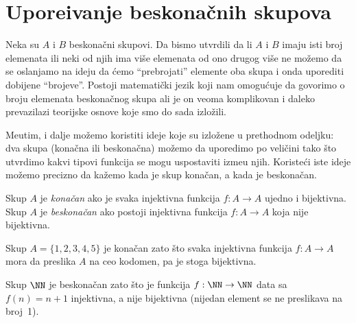 \section[UPORE\Dj IVANJE BESKONA\v CNIH SKUPOVA]{Upore\dj ivanje beskona\v cnih skupova}

Neka su $A$ i $B$ beskona\v cni skupovi. Da bismo utvrdili da li $A$ i $B$ imaju isti broj elemenata
ili neki od njih ima vi\v se elemenata od ono drugog vi\v se ne mo\v zemo da se oslanjamo na ideju da \'cemo
``prebrojati'' elemente oba skupa i onda uporediti dobijene ``brojeve''.
Postoji matemati\v cki jezik koji nam omogu\'cuje da govorimo o broju elemenata beskona\v cnog skupa ali je on
veoma komplikovan i daleko prevazilazi teorijske osnove koje smo do sada izlo\v zili.

Me\dj utim, i dalje mo\v zemo koristiti ideje koje su izlo\v zene u prethodnom odeljku:
dva skupa (kona\v cna ili beskona\v cna) mo\v zemo da uporedimo po veli\v cini tako \v sto
utvrdimo kakvi tipovi funkcija se mogu uspostaviti izme\dj u njih.
Koriste\'ci iste ideje mo\v zemo precizno da ka\v zemo kada je skup kona\v can, a kada je beskona\v can.

Skup $A$ je \emph{kona\v can} ako je svaka injektivna funkcija $f : A \to A$ ujedno i bijektivna.
Skup $A$ je \emph{beskona\v can} ako postoji injektivna funkcija $f : A \to A$ koja nije bijektivna.

\begin{EX}
  Skup $A = \{1, 2, 3, 4, 5\}$ je kona\v can zato \v sto svaka injektivna funkcija $f : A \to A$ mora da
  preslika $A$ na ceo kodomen, pa je stoga bijektivna.
  
  Skup $\NN$ je beskona\v can zato \v sto je funkcija $f : \NN \to \NN$ data sa $f(n) = n + 1$ injektivna, a nije
  bijektivna (nijedan element se ne preslikava na broj~1).
\end{EX}

